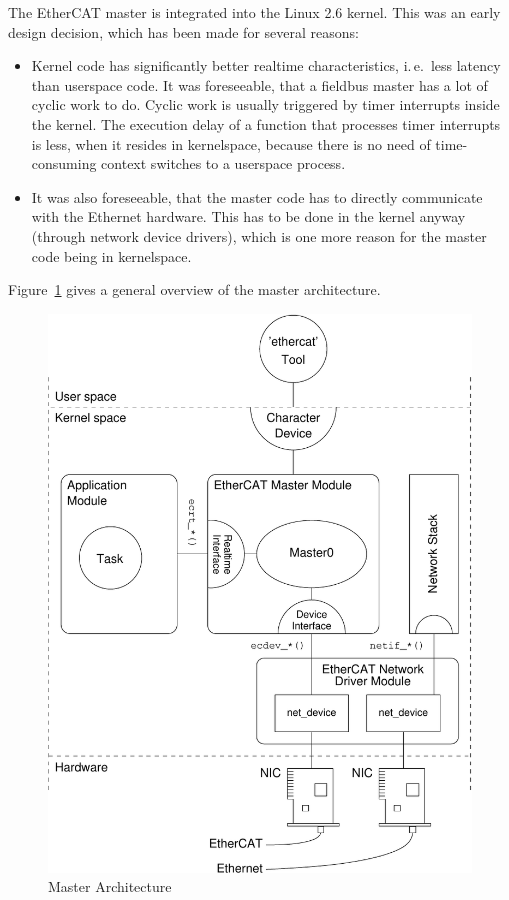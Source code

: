 \documentclass[a4paper,12pt,BCOR6mm,bibtotoc,idxtotoc]{scrbook}
\begin{document}
The EtherCAT master is integrated into the Linux 2.6 kernel. This was
an early design decision, which has been made for several reasons:

\begin{itemize}

\item Kernel code has significantly better realtime characteristics, i.\,e.\
less latency than userspace code. It was foreseeable, that a fieldbus master
has a lot of cyclic work to do. Cyclic work is usually triggered by timer
interrupts inside the kernel. The execution delay of a function that processes
timer interrupts is less, when it resides in kernelspace, because there is no
need of time-consuming context switches to a userspace process.

\item It was also foreseeable, that the master code has to directly
communicate with the Ethernet hardware. This has to be done in the kernel
anyway (through network device drivers), which is one more reason for the
master code being in kernelspace.

\end{itemize}

Figure~\ref{fig:arch} gives a general overview of the master architecture.

\begin{figure}[htbp]
  \centering
  \includegraphics[width=.9\textwidth]{images/architecture}
  \caption{Master Architecture}
  \label{fig:arch}
\end{figure}
\end{document}
